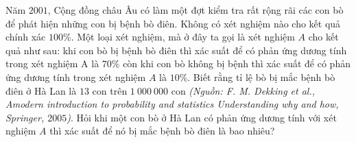 \begin{bt}%
	Năm $2001$, Cộng đồng châu Âu có làm một đợt kiểm tra rất rộng rãi các con bò để phát hiện những con bị bệnh bò điên. Không có xét nghiệm nào cho kết quả chính xác $100 \%$. Một loại xét nghiệm, mà ở đây ta gọi là xét nghiệm $A$ cho kết quả như sau: khi con bò bị bệnh bò điên thì xác suất để có phản ứng dương tính trong xét nghiệm A là $70 \%$ còn khi con bò không bị bệnh thì xác suất để có phản ứng dương tính trong xét nghiệm $A$ là $10 \%$. Biết rằng tỉ lệ bò bị mắc bệnh bò điên ở Hà Lan là $13$ con trên $1~000~000$ con \textit{(Nguồn: F. M. Dekking et al., Amodern introduction to probability and statistics Understanding why and how, Springer, $2005$)}. Hỏi khi một con bò ở Hà Lan có phản ứng dương tính với xét nghiệm $A$ thì xác suất để nó bị mắc bệnh bò điên là bao nhiêu?
\end{bt}
